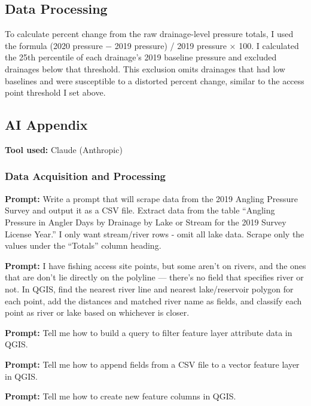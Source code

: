 \documentclass[11pt]{article}
\begin{document}
    \hypertarget{data-processing}{%
\subsection{Data Processing}\label{data-processing}}

To calculate percent change from the raw drainage-level pressure totals,
I used the formula (2020 pressure − 2019 pressure) / 2019 pressure ×
100. I calculated the 25th percentile of each drainage's 2019 baseline
pressure and excluded drainages below that threshold. This exclusion
omits drainages that had low baselines and were susceptible to a
distorted percent change, similar to the access point threshold I set
above.

    \hypertarget{ai-appendix}{%
\subsection{AI Appendix}\label{ai-appendix}}

\textbf{Tool used:} Claude (Anthropic)

\hypertarget{data-acquisition-and-processing}{%
\subsubsection{Data Acquisition and
Processing}\label{data-acquisition-and-processing}}

\textbf{Prompt:} Write a prompt that will scrape data from the 2019
Angling Pressure Survey and output it as a CSV file. Extract data from
the table ``Angling Pressure in Angler Days by Drainage by Lake or
Stream for the 2019 Survey License Year.'' I only want stream/river rows
- omit all lake data. Scrape only the values under the ``Totals'' column
heading.

\textbf{Prompt:} I have fishing access site points, but some aren't on
rivers, and the ones that are don't lie directly on the polyline ---
there's no field that specifies river or not. In QGIS, find the nearest
river line and nearest lake/reservoir polygon for each point, add the
distances and matched river name as fields, and classify each point as
river or lake based on whichever is closer.

\textbf{Prompt:} Tell me how to build a query to filter feature layer
attribute data in QGIS.

\textbf{Prompt:} Tell me how to append fields from a CSV file to a
vector feature layer in QGIS.

\textbf{Prompt:} Tell me how to create new feature columns in QGIS.
\end{document}
